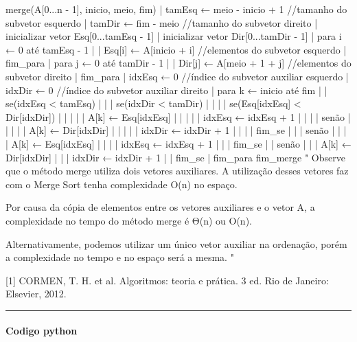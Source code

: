 \documentclass[11pt]{article}
\begin{document}
merge(A[0...n - 1], inicio, meio, fim)
|   tamEsq ← meio - inicio + 1 //tamanho do subvetor esquerdo
|   tamDir ← fim - meio //tamanho do subvetor direito
|   inicializar vetor Esq[0...tamEsq - 1]
|   inicializar vetor Dir[0...tamDir - 1]
|   para i ← 0 até tamEsq - 1
|   |   Esq[i] ← A[inicio + i] //elementos do subvetor esquerdo
|   fim_para
|   para j ← 0 até tamDir - 1
|   |   Dir[j] ← A[meio + 1 + j] //elementos do subvetor direito
|   fim_para
|   idxEsq ← 0 //índice do subvetor auxiliar esquerdo
|   idxDir ← 0 //índice do subvetor auxiliar direito
|   para k ← inicio até fim
|   |   se(idxEsq < tamEsq)
|   |   |   se(idxDir < tamDir)
|   |   |   |   se(Esq[idxEsq] < Dir[idxDir])
|   |   |   |   |   A[k] ← Esq[idxEsq]
|   |   |   |   |   idxEsq ← idxEsq + 1
|   |   |   |   senão
|   |   |   |   |   A[k] ← Dir[idxDir]
|   |   |   |   |   idxDir ← idxDir + 1
|   |   |   |   fim_se
|   |   |   senão
|   |   |   |   A[k] ← Esq[idxEsq]
|   |   |   |   idxEsq ← idxEsq + 1
|   |   |   fim_se
|   |   senão
|   |   |   A[k] ← Dir[idxDir]
|   |   |   idxDir ← idxDir + 1
|   |   fim_se
|   fim_para
fim_merge
    " Observe que o método merge utiliza dois vetores auxiliares. A
utilização desses vetores faz com o Merge Sort tenha complexidade O(n)
no espaço.

Por causa da cópia de elementos entre os vetores auxiliares e o vetor A,
a complexidade no tempo do método merge é Θ(n) ou O(n).

Alternativamente, podemos utilizar um único vetor auxiliar na ordenação,
porém a complexidade no tempo e no espaço será a mesma. "

{[}1{]} CORMEN, T. H. et al. Algoritmos: teoria e prática. 3 ed. Rio de
Janeiro: Elsevier, 2012.

\begin{center}\rule{0.5\linewidth}{\linethickness}\end{center}

    \paragraph{Codigo python}\label{codigo-python}
\end{document}
